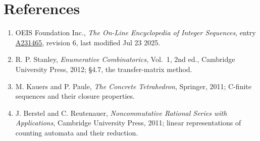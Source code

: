 \documentclass[11pt]{article}
\theoremstyle{definition}
\begin{document}
\section{References}

\begin{enumerate}

\item OEIS Foundation Inc., \emph{The On-Line Encyclopedia of Integer Sequences}, entry \href{https://oeis.org/A231465}{A231465}, revision 6, last modified Jul 23 2025.

\item R. P. Stanley, \emph{Enumerative Combinatorics}, Vol.~1, 2nd ed., Cambridge University Press, 2012; \S4.7, the transfer-matrix method.

\item M. Kauers and P. Paule, \emph{The Concrete Tetrahedron}, Springer, 2011; C-finite sequences and their closure properties.

\item J. Berstel and C. Reutenauer, \emph{Noncommutative Rational Series with Applications}, Cambridge University Press, 2011; linear representations of counting automata and their reduction.

\end{enumerate}
\end{document}
